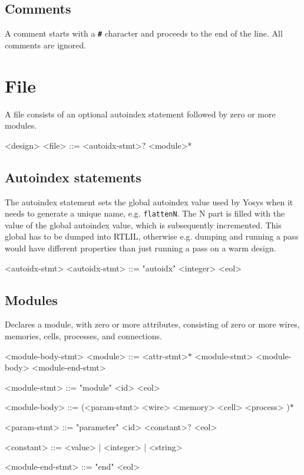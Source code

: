 \subsection{Comments}

A comment starts with a \texttt{\textbf{\#}} character and proceeds to the end of the line. All comments are ignored.

\section{File}

A file consists of an optional autoindex statement followed by zero or more modules.

\begin{indentgrammar}{<design>}
<file> ::= <autoidx-stmt>$?$ <module>*
\end{indentgrammar}

\subsection{Autoindex statements}

The autoindex statement sets the global autoindex value used by Yosys when it needs to generate a unique name, e.g. \texttt{\textdollar{}flatten\textdollar{}N}. The N part is filled with the value of the global autoindex value, which is subsequently incremented. This global has to be dumped into RTLIL, otherwise e.g. dumping and running a pass would have different properties than just running a pass on a warm design.

\begin{indentgrammar}{<autoidx-stmt>}
<autoidx-stmt> ::= "autoidx" <integer> <eol>
\end{indentgrammar}

\subsection{Modules}

Declares a module, with zero or more attributes, consisting of zero or more wires, memories, cells, processes, and connections.

\begin{indentgrammar}{<module-body-stmt>}
<module> ::= <attr-stmt>$*$ <module-stmt> <module-body> <module-end-stmt>

<module-stmt> ::= "module" <id> <eol>

<module-body> ::= 
(<param-stmt>
  \alt <wire>
  \alt <memory>
  \alt <cell>
  \alt <process>
  )$*$

<param-stmt> ::= "parameter" <id> <constant>$?$ <eol>

<constant> ::= <value> | <integer> | <string>

<module-end-stmt> ::= "end" <eol>
\end{indentgrammar}


